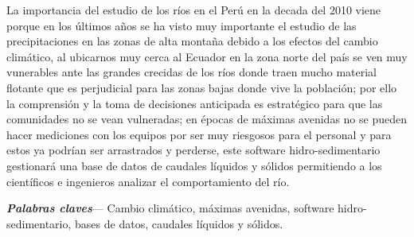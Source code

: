 La importancia del estudio de los ríos en el Perú en la decada del 2010 viene porque en los últimos años se ha visto muy importante el estudio de las precipitaciones en las zonas de alta montaña debido a los efectos del cambio climático, al ubicarnos muy cerca al Ecuador en la zona norte del país se ven muy vunerables ante las grandes crecidas de los ríos donde traen mucho material flotante que es perjudicial para las zonas bajas donde vive la población; por ello la comprensión y la toma de decisiones anticipada es estratégico para que las comunidades no se vean vulneradas; en épocas de máximas avenidas no se pueden hacer mediciones con los equipos por ser muy riesgosos para el personal y para estos ya podrían ser arrastrados y perderse, este software hidro-sedimentario gestionará una base de datos de caudales líquidos y sólidos permitiendo a los científicos e ingenieros analizar el comportamiento del río.



\vspace{1cm}
\textbf{\textit{Palabras claves}}--- 
Cambio climático, máximas avenidas, software hidro-sedimentario, bases de datos, caudales líquidos y sólidos.






























\newpage
\tableofcontents
\newpage
\listoftables

\listoffigures


